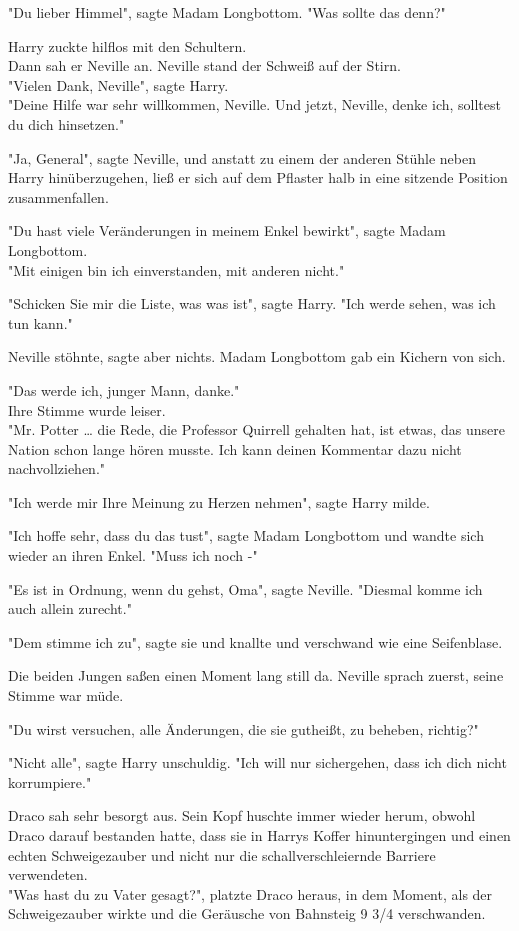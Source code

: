 {"Du lieber Himmel", sagte Madam Longbottom. "Was sollte das denn?"

Harry zuckte hilflos mit den Schultern.\\ Dann sah er Neville an. Neville stand der Schweiß auf der Stirn.\\ "Vielen Dank, Neville", sagte Harry.\\ "Deine Hilfe war sehr willkommen, Neville. Und jetzt, Neville, denke ich, solltest du dich hinsetzen."

"Ja, General", sagte Neville, und anstatt zu einem der anderen Stühle neben Harry hinüberzugehen, ließ er sich auf dem Pflaster halb in eine sitzende Position zusammenfallen.

"Du hast viele Veränderungen in meinem Enkel bewirkt", sagte Madam Longbottom.\\ "Mit einigen bin ich einverstanden, mit anderen nicht."

"Schicken Sie mir die Liste, was was ist", sagte Harry. "Ich werde sehen, was ich tun kann."

Neville stöhnte, sagte aber nichts. Madam Longbottom gab ein Kichern von sich.

"Das werde ich, junger Mann, danke."\\ Ihre Stimme wurde leiser.\\ "Mr. Potter … die Rede, die Professor Quirrell gehalten hat, ist etwas, das unsere Nation schon lange hören musste. Ich kann deinen Kommentar dazu nicht nachvollziehen."

"Ich werde mir Ihre Meinung zu Herzen nehmen", sagte Harry milde.

"Ich hoffe sehr, dass du das tust", sagte Madam Longbottom und wandte sich wieder an ihren Enkel. "Muss ich noch -"

"Es ist in Ordnung, wenn du gehst, Oma", sagte Neville. "Diesmal komme ich auch allein zurecht."

"Dem stimme ich zu", sagte sie und knallte und verschwand wie eine Seifenblase.

Die beiden Jungen saßen einen Moment lang still da. Neville sprach zuerst, seine Stimme war müde.

"Du wirst versuchen, alle Änderungen, die sie gutheißt, zu beheben, richtig?"

"Nicht alle", sagte Harry unschuldig. "Ich will nur sichergehen, dass ich dich nicht korrumpiere."

Draco sah sehr besorgt aus. Sein Kopf huschte immer wieder herum, obwohl Draco darauf bestanden hatte, dass sie in Harrys Koffer hinuntergingen und einen echten Schweigezauber und nicht nur die schallverschleiernde Barriere verwendeten.\\ "Was hast du zu Vater gesagt?", platzte Draco heraus, in dem Moment, als der Schweigezauber wirkte und die Geräusche von Bahnsteig 9 3/4 verschwanden.

}
